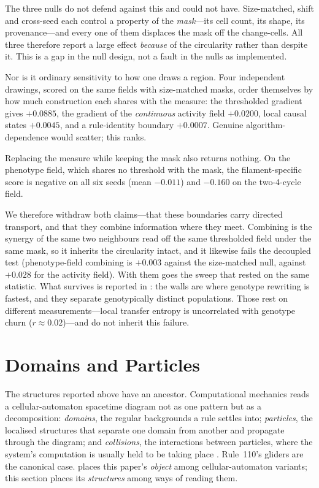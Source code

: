 \documentclass[man,12pt,floatsintext,donotrepeattitle]{apa7}
\newcommand{\secref}[1]{\emph{\nameref{#1}}}
\begin{document}
The three nulls do not defend against this and could not have. Size-matched,
shift and cross-seed each control a property of the \emph{mask}---its cell
count, its shape, its provenance---and every one of them displaces the mask off
the change-cells. All three therefore report a large effect \emph{because} of
the circularity rather than despite it. This is a gap in the null design, not a
fault in the nulls as implemented.

Nor is it ordinary sensitivity to how one draws a region. Four independent
drawings, scored on the same fields with size-matched masks, order themselves by
how much construction each shares with the measure: the thresholded gradient
gives $+0.0885$, the gradient of the \emph{continuous} activity field $+0.0200$,
local causal states $+0.0045$, and a rule-identity boundary $+0.0007$. Genuine
algorithm-dependence would scatter; this ranks.

Replacing the measure while keeping the mask also returns nothing. On the
phenotype field, which shares no threshold with the mask, the filament-specific
score is negative on all six seeds (mean $-0.011$) and $-0.160$ on the
two-4-cycle field.

We therefore withdraw both claims---that these boundaries carry directed
transport, and that they combine information where they meet. Combining is the
synergy of the same two neighbours read off the same thresholded field under the
same mask, so it inherits the circularity intact, and it likewise fails the
decoupled test (phenotype-field combining is $+0.003$ against the size-matched
null, against $+0.028$ for the activity field). With them goes the sweep that
rested on the same statistic. What survives is
reported in \secref{sec:discussion}: the walls are where genotype rewriting is
fastest, and they separate genotypically distinct populations. Those rest on
different measurements---local transfer entropy is uncorrelated with genotype
churn ($r \approx 0.02$)---and do not inherit this failure.


\section{Domains and Particles}
\label{sec:relwork}

The structures reported above have an ancestor. Computational mechanics reads a
cellular-automaton spacetime diagram not as one pattern but as a decomposition:
\emph{domains}, the regular backgrounds a rule settles into; \emph{particles},
the localised structures that separate one domain from another and propagate
through the diagram; and \emph{collisions}, the interactions between particles,
where the system's computation is usually held to be taking place
\parencite{crutchfield1993turbulent,hanson1997compmech}. Rule~110's gliders are
the canonical case. \secref{sec:object} places this paper's \emph{object} among
cellular-automaton variants; this section places its \emph{structures} among
ways of reading them.
\end{document}
